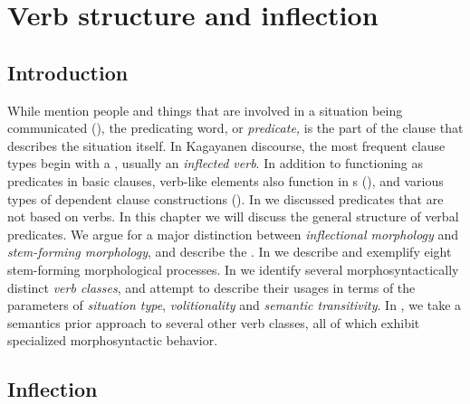 \chapter{Verb structure and inflection}
\label{chap:verbstructure}
\section{Introduction}
\label{sec:introduction-6}

While  mention people and things that are involved in a situation being communicated (), the predicating word, or \textit{predicate,} is the part of the clause that describes the situation itself. In Kagayanen discourse, the most frequent clause types begin with a , usually an \textit{inflected verb}. In addition to functioning as predicates in basic clauses, verb-like elements also function in s (), and various types of dependent clause constructions (). In  we discussed predicates that are not based on verbs. In this chapter we will discuss the general structure of verbal predicates. We argue for a major distinction between \textit{inflectional morphology} and \textit{stem-forming morphology}, and describe the . In  we describe and exemplify eight stem-forming morphological processes. In  we identify several morphosyntactically distinct \textit{verb classes}, and attempt to describe their usages in terms of the parameters of \textit{situation type}, \textit{volitionality} and \textit{semantic transitivity}. In , we take a semantics prior approach to several other verb classes, all of which exhibit specialized morphosyntactic behavior.

\section{Inflection}
\label{sec:verbstructureandinflection}

